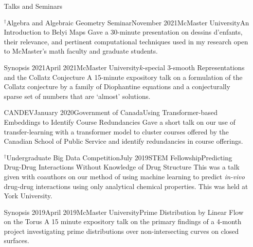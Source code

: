 \begin{rSection}{Talks and Seminars}

\begin{rSubsection}{$^\dagger$Algebra and Algebraic Geometry Seminar}{November 2021}{McMaster University}{An Introduction to Belyi Maps}
	Gave a 30-minute presentation on dessins d'enfants, their relevance, and pertinent computational techniques used in my research open to McMaster's math faculty and graduate students.
\end{rSubsection}
\smallskip

\begin{rSubsection}{Synopsis 2021}{April 2021}{McMaster University}{$k$-special $3$-smooth Representations and the Collatz Conjecture}
	A 15-minute expository talk on a formulation of the Collatz conjecture by a family of Diophantine equations and a conjecturally sparse set of numbers that are `almost' solutions.
\end{rSubsection}
\smallskip

\begin{rSubsection}{CANDEV}{January 2020}{Government of Canada}{Using Transformer-based Embeddings to  Identify Course Redundancies}
	Gave a short talk on our use of transfer-learning with a transformer model to cluster courses offered by the Canadian School of Public Service and identify redundancies in course offerings.
\end{rSubsection}
\smallskip

\begin{rSubsection}{$^\dagger$Undergraduate Big Data Competition}{July 2019}{STEM Fellowship}{Predicting Drug-Drug Interactions Without Knowledge of Drug Structure}
	This was a talk given with coauthors on our method of using machine learning to predict \textit{in-vivo} drug-drug interactions using only analytical chemical properties. This was held at York University.
\end{rSubsection}
\smallskip

\begin{rSubsection}{Synopsis 2019}{April 2019}{McMaster University}{Prime Distribution by Linear Flow on the Torus}
	A 15 minute expository talk on the primary findings of a 4-month project investigating prime distributions over non-intersecting curves on closed surfaces.
\end{rSubsection}
\smallskip




\end{rSection}
